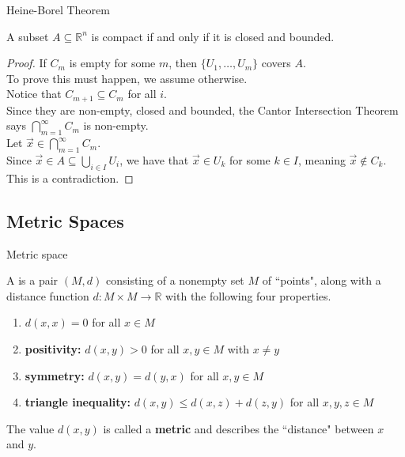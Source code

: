 \documentclass{beamer}
\begin{document}
\begin{frame}{Heine-Borel Theorem}
\begin{thm}
A subset $A\subseteq\mathbb{R}^n$ is compact if and only if it is closed and bounded.
\end{thm}
\begin{proof}
\pause
If $C_m$ is empty for some $m$, then $\{U_1,\dots, U_m\}$ covers $A$.\\
\pause
To prove this must happen, we assume otherwise.\\
\pause
Notice that $C_{m+1}\subseteq C_m$ for all $i$.\\
\pause
Since they are non-empty, closed and bounded, the Cantor Intersection Theorem says $\bigcap_{m=1}^\infty C_m$ is non-empty.\\
\pause
Let $\vec x\in \bigcap_{m=1}^\infty C_m$.\\
\pause
Since $\vec x\in A\subseteq \bigcup_{i\in I} U_i$, we have that $\vec x\in U_k$ for some $k\in I$, meaning $\vec x\notin C_k$.\\
\pause
This is a contradiction.
\end{proof}
\end{frame}

\subsection{Metric Spaces}

\begin{frame}{Metric space}
\pause
\begin{defn}
A  is a pair $(M,d)$ consisting of a nonempty set $M$ of ``points", along with a distance function $d: M\times M\rightarrow\mathbb{R}$ with the following four properties.
\pause
\begin{enumerate}[\text{A}1]
\pause
\item $d(x,x) = 0$ for all $x\in M$
\pause
\item \textbf{positivity:}  $d(x,y) > 0$ for all $x,y\in M$ with $x\neq y$
\pause
\item \textbf{symmetry:}  $d(x,y) = d(y,x)$ for all $x,y\in M$
\pause
\item \textbf{triangle inequality:} $d(x,y)\leq d(x,z) + d(z,y)$ for all $x,y,z\in M$
\end{enumerate}
\end{defn}
\pause
The value $d(x,y)$ is called a \textbf{metric} and describes the ``distance" between $x$ and $y$.
\end{frame}
\end{document}
